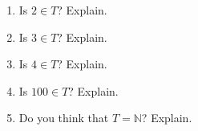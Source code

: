 \begin{previewactivity}
\begin{enumerate}
\begin{multicols}{2}
\begin{enumerate}
  \item Is  $2 \in T$?  Explain.
  \item Is  $3 \in T$?  Explain.
  \item Is  $4 \in T$?  Explain.
  \item Is  $100 \in T$?  Explain.
  \item Do you think that  $T = \mathbb{N}$?  Explain.
\end{enumerate}
\end{multicols}

\end{enumerate}
\end{previewactivity}
\hbreak
\endinput

